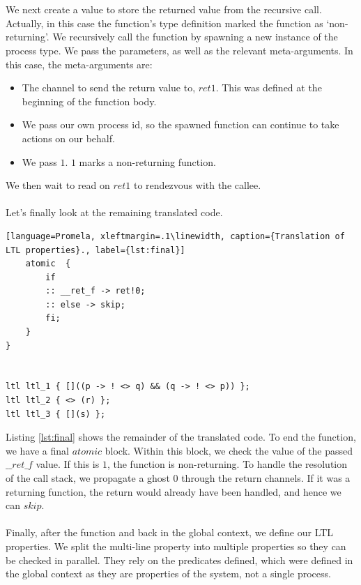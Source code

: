 \\ \\
We next create a value to store the returned value from the recursive call. Actually, in this case the function's type definition marked the function as `non-returning'. We recursively call the function by spawning a new instance of the process type. We pass the parameters, as well as the relevant meta-arguments. In this case, the meta-arguments are:
\begin{itemize}
    \item The channel to send the return value to, $ret1$. This was defined at the beginning of the function body.
    \item We pass our own process id, so the spawned function can continue to take actions on our behalf.
    \item We pass $1$. $1$ marks a non-returning function.
\end{itemize}
We then wait to read on $ret1$ to rendezvous with the callee.
\\ \\
Let's finally look at the remaining translated code.
\begin{lstlisting}[language=Promela, xleftmargin=.1\linewidth, caption={Translation of LTL properties}., label={lst:final}]
    atomic  {
        if
        :: __ret_f -> ret!0;
        :: else -> skip;
        fi;
    }
}


ltl ltl_1 { []((p -> ! <> q) && (q -> ! <> p)) };
ltl ltl_2 { <> (r) };
ltl ltl_3 { [](s) };
\end{lstlisting}
Listing \ref{lst:final} shows the remainder of the translated code. To end the function, we have a final $atomic$ block. Within this block, we check the value of the passed $\_\_ret\_f$ value. If this is $1$, the function is non-returning. To handle the resolution of the call stack, we propagate a ghost $0$ through the return channels. If it was a returning function, the return would already have been handled, and hence we can $skip$.
\\ \\
Finally, after the function and back in the global context, we define our LTL properties. We split the multi-line property into multiple properties so they can be checked in parallel. They rely on the predicates defined, which were defined in the global context as they are properties of the system, not a single process.
\\ \\
